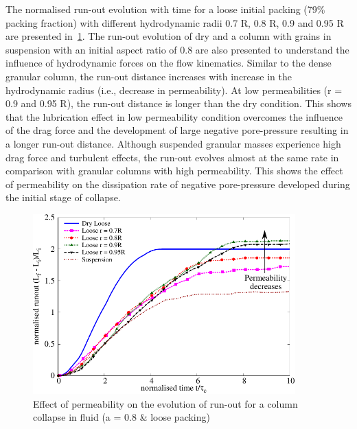 The normalised run-out evolution with time for a loose initial packing (79\% 
packing fraction) with different hydrodynamic radii 0.7 R, 0.8 R, 0.9 and 0.95 
R are presented in~\cref{fig:Runout_a08_loose}. The run-out evolution of dry 
and a column with grains in suspension with an 
initial aspect ratio of 0.8 are also presented to understand the influence of 
hydrodynamic forces on the flow kinematics. Similar to the dense granular 
column, the run-out distance increases with increase in the hydrodynamic radius 
(i.e., decrease in permeability). At low permeabilities (r = 0.9 and 0.95 R), 
the run-out distance is longer than the dry condition. This shows that the 
lubrication effect in low permeability condition overcomes the influence of 
the drag force and the development of large negative pore-pressure resulting in 
a longer run-out distance. Although suspended granular masses experience high 
drag 
force and turbulent effects, the run-out evolves almost at the same rate in 
comparison with granular columns with high permeability. This shows the effect 
of permeability on the dissipation rate of negative pore-pressure developed 
during the initial stage of collapse.

\begin{figure}
\centering
\includegraphics[width=0.9\textwidth]{Runout_a08_loose}
\caption{Effect of permeability on the evolution of run-out for a column 
collapse in fluid (a = 0.8 \& loose packing)}
\label{fig:Runout_a08_loose}
\end{figure}

